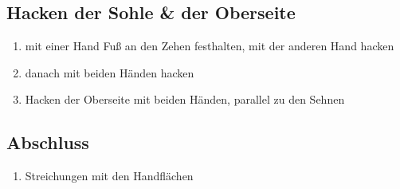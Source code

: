 \subsection{Hacken der Sohle \& der Oberseite}
\begin{enumerate}
\item mit einer Hand Fuß an den Zehen festhalten, mit der anderen Hand hacken
\item danach mit beiden Händen hacken
\item Hacken der Oberseite mit beiden Händen, parallel zu den Sehnen
\end{enumerate}

\subsection{Abschluss}
\begin{enumerate}
\item Streichungen mit den Handflächen
\end{enumerate}
